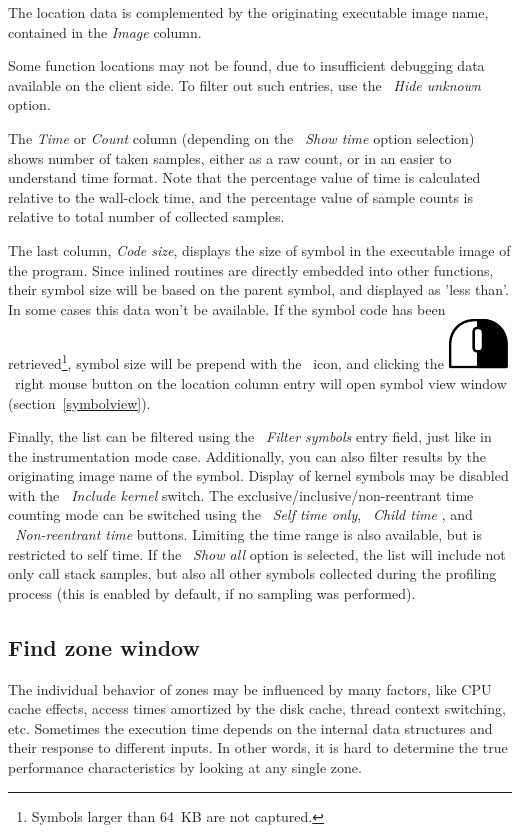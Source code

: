 \documentclass[hidelinks,titlepage,a4paper]{article}
\newcommand{\RMB}{\includegraphics[height=.8\baselineskip]{icons/rmb}}
\begin{document}
The location data is complemented by the originating executable image name, contained in the \emph{Image} column.

Some function locations may not be found, due to insufficient debugging data available on the client side. To filter out such entries, use the \emph{\faEyeSlash{}~Hide unknown} option.

The \emph{Time} or \emph{Count} column (depending on the \emph{\faStopwatch{}~Show time} option selection) shows number of taken samples, either as a raw count, or in an easier to understand time format. Note that the percentage value of time is calculated relative to the wall-clock time, and the percentage value of sample counts is relative to total number of collected samples.

The last column, \emph{Code size}, displays the size of symbol in the executable image of the program. Since inlined routines are directly embedded into other functions, their symbol size will be based on the parent symbol, and displayed as 'less than'. In some cases this data won't be available. If the symbol code has been retrieved\footnote{Symbols larger than 64~KB are not captured.}, symbol size will be prepend with the \texttt{\faDatabase}~icon, and clicking the \RMB{}~right mouse button on the location column entry will open symbol view window (section~\ref{symbolview}).

Finally, the list can be filtered using the \emph{\faFilter{}~Filter symbols} entry field, just like in the instrumentation mode case. Additionally, you can also filter results by the originating image name of the symbol. Display of kernel symbols may be disabled with the \emph{\faHatWizard{}~Include kernel} switch. The exclusive/inclusive/non-reentrant time counting mode can be switched using the \emph{\faClock{}~Self time only}, \emph{\faClock{}~Child time} , and \emph{\faClock{}~Non-reentrant time} buttons. Limiting the time range is also available, but is restricted to self time. If the \emph{\faPuzzlePiece{}~Show all} option is selected, the list will include not only call stack samples, but also all other symbols collected during the profiling process (this is enabled by default, if no sampling was performed).

\subsection{Find zone window}
\label{findzone}

The individual behavior of zones may be influenced by many factors, like CPU cache effects, access times amortized by the disk cache, thread context switching, etc. Sometimes the execution time depends on the internal data structures and their response to different inputs. In other words, it is hard to determine the true performance characteristics by looking at any single zone.
\end{document}
